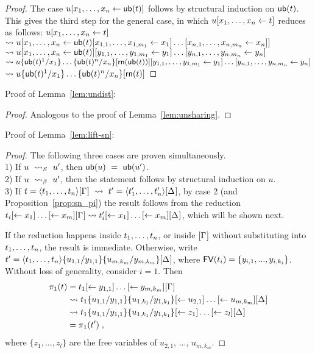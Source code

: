 \documentclass[orivec]{llncs}
\begin{document}
\begin{proof}
The case $u\share x{\sn(t)}$ follows by structural induction on ${\mathsf{ub}}(t)$.
%
This gives the third step for the general case, in which
$u\share xt$ reduces as follows: $u\share xt$
\\ $ \rewrite u\share x{\sn(t)\share*{x_{1,1},\dots,x_{1,m_1}}{x_1}\dots\share*{x_{n,1},\dots,x_{n,m_n}}{x_n}}$
\\ $ \rewrite u\share x{\sn(t)}\share*{y_{1,1},\dots,y_{1,m_1}}{y_1}\dots\share*{y_{n,1},\dots,y_{n,m_n}}{y_n}$
\\ $ \rewrite u\sub{x_1}{\sn(t)^1}\dots\sub{x_n}{\sn(t)^n}[\sh(\sn(t))]\share*{y_{1,1},\dots,y_{1,m_1}}{y_1}\dots\share*{y_{n,1},\dots,y_{n,m_n}}{y_n}$
\\ $\rewrite u\sub{x_1}{\sn(t)^1}\dots\sub{x_n}{\sn(t)^n}[\sh(t)]$
\end{proof}

Proof of Lemma~\ref{lem:undist}:

\begin{proof}
Analogous to the proof of Lemma~\ref{lem:unsharing}.
\end{proof}

Proof of Lemma~\ref{lem:lift-sn}:

\begin{proof}
The following three cases are proven simultaneously.
\\ 1) If $u ~\ALnotbeta~ u'$, then ${\mathsf{ub}}(u) ~=~ {\mathsf{ub}}(u')$.
\\ 2) If $u ~\ALbeta~ u'$, then the statement follows by structural induction on $u$.
\\ 3) If $t=\tup t\G ~\rewrite~ t'=\tup{t'}\G*$, by case 2 (and Proposition~\ref{prop:sn_pi}) the result follows from the reduction
%
	$t_i\share*{}{x_1}\dots\share*{}{x_m}\G\rewrite
	 t'_i\share*{}{x_1}\dots\share*{}{x_m}\G*$,
which will be shown next.

If the reduction happens inside $\vv t$, or inside $\G$ without substituting into
$\vv t$, the result is immediate.
%
Otherwise, write $t'=\tup t\sub{y_{1,1}}{u_{1,1}}\sub{y_{m,k_m}}{u_{m,k_m}}\G*$, where ${\mathop{\mathsf{FV}}}(t_i)=\{y_{i,1},...,y_{i,k_i}\}$.
%
Without loss of generality, consider $i=1$. Then
%
\[
\begin{aligned}
\pi_1(t)
	&= t_1\share*{}{y_{1,1}}\dots\share*{}{y_{m,k_m}}\G
\\ &\rewrite t_1\sub{y_{1,1}}{u_{1,1}}\sub{y_{1,k_1}}{u_{1,k_1}}\share*{}{u_{2,1}}\dots\share*{}{u_{m,k_m}}\G*
\\ &\rewrite t_1\sub{y_{1,1}}{u_{1,1}}\sub{y_{1,k_1}}{u_{1,k_1}}\share*{}{z_1}\dots\share*{}{z_l}\G*
\\ &= \pi_1(t')\;,
\end{aligned}
\]
%
where $\{z_1, \dots, z_l\}$ are the free variables of $u_{2,1}$,
$\dots$, $u_{m,k_m}$.

\end{proof}
\end{document}
